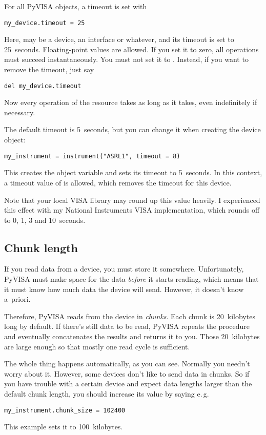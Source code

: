 \documentclass{howto}
\begin{document}
For all PyVISA objects, a timeout is set with
\begin{verbatim}
my_device.timeout = 25
\end{verbatim}
Here,  may be a device, an interface or whatever, and its
timeout is set to 25~seconds.  Floating-point values are allowed.  If you set
it to zero, all operations must succeed instantaneously.  You must not set it
to .  Instead, if you want to remove the timeout, just say
\begin{verbatim}
del my_device.timeout
\end{verbatim}
Now every operation of the resource takes as long as it takes, even
indefinitely if necessary.

The default timeout is 5~seconds, but you can change it when creating the
device object:
\begin{verbatim}
my_instrument = instrument("ASRL1", timeout = 8)
\end{verbatim}
This creates the object variable  and sets its timeout to
5~seconds.  In this context, a timeout value of  is allowed, which
removes the timeout for this device.

Note that your local VISA library may round up this value heavily.  I
experienced this effect with my National Instruments VISA implementation, which
rounds off to 0, 1, 3 and 10~seconds.


\subsection{Chunk length}
\label{sec:chunk-length}

If you read data from a device, you must store it somewhere.  Unfortunately,
PyVISA must make space for the data \emph{before} it starts reading, which
means that it must know how much data the device will send.  However, it
doesn't know a~priori.

Therefore, PyVISA reads from the device in \emph{chunks}.  Each chunk is
20~kilobytes long by default.  If there's still data to be read, PyVISA repeats
the procedure and eventually concatenates the results and returns it to you.
Those 20~kilobytes are large enough so that mostly one read cycle is
sufficient.

The whole thing happens automatically, as you can see.  Normally you needn't
worry about it.  However, some devices don't like to send data in chunks.  So
if you have trouble with a certain device and expect data lengths larger than
the default chunk length, you should increase its value by saying e.\,g.
\begin{verbatim}
my_instrument.chunk_size = 102400
\end{verbatim}
This example sets it to 100~kilobytes.
\end{document}
